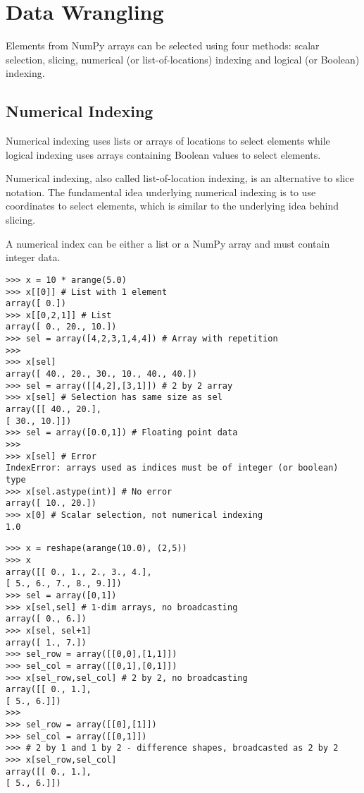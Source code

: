 \documentclass[KSmain.tex]{subfiles}
\begin{document}
 

\section{Data Wrangling}
Elements from NumPy arrays can be selected using four methods: scalar selection, slicing, numerical (or
list-of-locations) indexing and logical (or Boolean) indexing.


\subsection{Numerical Indexing}
Numerical indexing uses lists or arrays of locations
to select elements while logical indexing uses arrays containing Boolean values to select elements.

Numerical indexing, also called list-of-location indexing, is an alternative to slice notation. The fundamental
idea underlying numerical indexing is to use coordinates to select elements, which is similar to
the underlying idea behind slicing.

A numerical index can be either a list or a NumPy array and must contain integer data.
\begin{framed}
\begin{verbatim}
>>> x = 10 * arange(5.0)
>>> x[[0]] # List with 1 element
array([ 0.])
>>> x[[0,2,1]] # List
array([ 0., 20., 10.])
>>> sel = array([4,2,3,1,4,4]) # Array with repetition
>>>
>>> x[sel]
array([ 40., 20., 30., 10., 40., 40.])
>>> sel = array([[4,2],[3,1]]) # 2 by 2 array
>>> x[sel] # Selection has same size as sel
array([[ 40., 20.],
[ 30., 10.]])
>>> sel = array([0.0,1]) # Floating point data
>>>
>>> x[sel] # Error
IndexError: arrays used as indices must be of integer (or boolean) type
>>> x[sel.astype(int)] # No error
array([ 10., 20.])
>>> x[0] # Scalar selection, not numerical indexing
1.0

\end{verbatim}
\end{framed}


\begin{framed}
\begin{verbatim}
>>> x = reshape(arange(10.0), (2,5))
>>> x
array([[ 0., 1., 2., 3., 4.],
[ 5., 6., 7., 8., 9.]])
>>> sel = array([0,1])
>>> x[sel,sel] # 1-dim arrays, no broadcasting
array([ 0., 6.])
>>> x[sel, sel+1]
array([ 1., 7.])
>>> sel_row = array([[0,0],[1,1]])
>>> sel_col = array([[0,1],[0,1]])
>>> x[sel_row,sel_col] # 2 by 2, no broadcasting
array([[ 0., 1.],
[ 5., 6.]])
>>>
>>> sel_row = array([[0],[1]])
>>> sel_col = array([[0,1]])
>>> # 2 by 1 and 1 by 2 - difference shapes, broadcasted as 2 by 2
>>> x[sel_row,sel_col] 
array([[ 0., 1.],
[ 5., 6.]])
\end{verbatim}
\end{framed}
\end{document}
